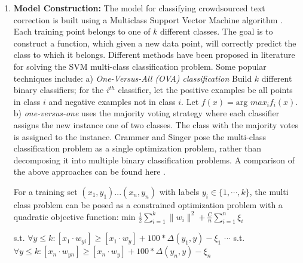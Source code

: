 \documentclass[10pt, conference, compsocconf]{IEEEtran}
\begin{document}
\begin{enumerate}
\item \textbf{Model Construction: } The model for classifying crowdsourced text correction is built using a Multiclass Support Vector Machine algorithm \cite{Tsochantaridis_2004}. Each training point belongs to one of $k$ different classes. The goal is to construct a function, which given a new data point, will correctly predict the class to which it belongs.
Different methods have been proposed in literature for solving the SVM multi-class classification problem. Some popular techniques include: a) \textit{One-Versus-All (OVA) classification} Build $k$ different binary classifiers; for the $i^{th}$ classifier, let the positive examples be all points in class $i$ and negative examples not in class $i$. Let $f(x) = \text{arg } max_i f_i(x) $.  b) \textit{one-versus-one} uses the majority voting strategy where each classifier assigns the new instance one of two classes. The class with the majority votes is assigned to the instance.
Crammer and Singer \cite{crammer} pose the multi-class classification problem as a single optimization problem, rather than decomposing it into multiple binary classification problems. A comparison of the above approaches can be found here \cite{comparison}.

For a training set $(x_1,y_1) ... (x_n,y_n)$ with labels $y_i \in \{1, \cdots, k\}$, the multi class problem can be posed as a constrained optimization problem with a quadratic objective function:
$\text{min } \frac{1}{2} \sum_{i = 1}^{k} \parallel w_{i}\parallel^2 + \frac{C}{n} \sum_{i = 1}^{n}\xi_{i} $

s.t. $\forall y \leq k : [x_{1} \cdot w_{yi}] \geq [x_{1} \cdot w_{y}] + 100*\Delta(y_{1},y)-\xi_{1}$
$\cdots$
s.t. $\forall y \leq k : [x_{n} \cdot w_{yn}] \geq [x_{n} \cdot w_{y}] + 100*\Delta(y_{n},y)-\xi_{n}$


\end{enumerate}
\end{document}
